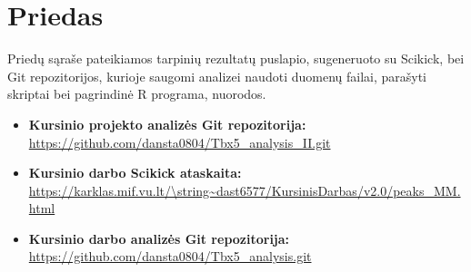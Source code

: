 \documentclass[12pt]{article}
\begin{document}
\newpage


\section{Priedas} \label{Priedas}

Priedų sąraše pateikiamos tarpinių rezultatų puslapio, sugeneruoto su Scikick,
bei Git repozitorijos, kurioje saugomi analizei naudoti duomenų failai,
parašyti skriptai bei pagrindinė R programa, nuorodos.

\begin{itemize}
    \item \textbf{Kursinio projekto analizės Git repozitorija:}\\
        \url{https://github.com/dansta0804/Tbx5\_analysis\_II.git}
    \item \textbf{Kursinio darbo Scikick ataskaita:}\\
        \url{https://karklas.mif.vu.lt/\string~dast6577/KursinisDarbas/v2.0/peaks\_MM.html}
    \item \textbf{Kursinio darbo analizės Git repozitorija:}\\
        \url{https://github.com/dansta0804/Tbx5\_analysis.git}
  \end{itemize}
\end{document}
